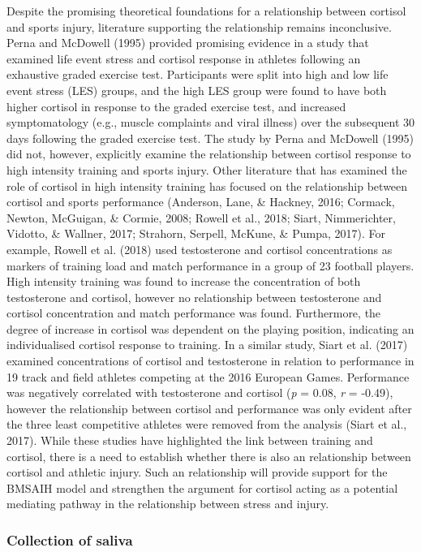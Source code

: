 \documentclass[man,floatsintext]{apa6}
\begin{document}
Despite the promising theoretical foundations for a relationship between cortisol and sports injury, literature supporting the relationship remains inconclusive.
Perna and McDowell (1995) provided promising evidence in a study that examined life event stress and cortisol response in athletes following an exhaustive graded exercise test.
Participants were split into high and low life event stress (LES) groups, and the high LES group were found to have both higher cortisol in response to the graded exercise test, and increased symptomatology (e.g., muscle complaints and viral illness) over the subsequent 30 days following the graded exercise test.
The study by Perna and McDowell (1995) did not, however, explicitly examine the relationship between cortisol response to high intensity training and sports injury.
Other literature that has examined the role of cortisol in high intensity training has focused on the relationship between cortisol and sports performance (Anderson, Lane, \& Hackney, 2016; Cormack, Newton, McGuigan, \& Cormie, 2008; Rowell et al., 2018; Siart, Nimmerichter, Vidotto, \& Wallner, 2017; Strahorn, Serpell, McKune, \& Pumpa, 2017).
For example, Rowell et al. (2018) used testosterone and cortisol concentrations as markers of training load and match performance in a group of 23 football players.
High intensity training was found to increase the concentration of both testosterone and cortisol, however no relationship between testosterone and cortisol concentration and match performance was found.
Furthermore, the degree of increase in cortisol was dependent on the playing position, indicating an individualised cortisol response to training.
In a similar study, Siart et al. (2017) examined concentrations of cortisol and testosterone in relation to performance in 19 track and field athletes competing at the 2016 European Games.
Performance was negatively correlated with testosterone and cortisol (\emph{p} = 0.08, \emph{r} = -0.49), however the relationship between cortisol and performance was only evident after the three least competitive athletes were removed from the analysis (Siart et al., 2017).
While these studies have highlighted the link between training and cortisol, there is a need to establish whether there is also an relationship between cortisol and athletic injury.
Such an relationship will provide support for the BMSAIH model and strengthen the argument for cortisol acting as a potential mediating pathway in the relationship between stress and injury.

\hypertarget{collection-of-saliva}{%
\subsubsection{Collection of saliva}\label{collection-of-saliva}}
\end{document}
